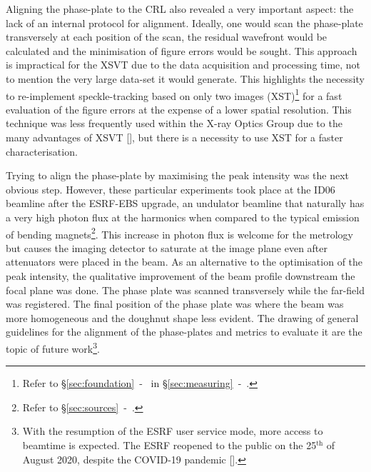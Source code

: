 \begin{refsection}
Aligning the phase-plate to the CRL also revealed a very important aspect: the lack of an internal protocol for alignment. Ideally, one would scan the phase-plate transversely at each position of the scan, the residual wavefront would be calculated and the minimisation of figure errors would be sought. This approach is impractical for the XSVT due to the data acquisition and processing time, not to mention the very large data-set it would generate. This highlights the necessity to re-implement speckle-tracking based on only two images (XST)\footnote{Refer to \S\ref{sec:foundation}~-~\textit{} in \S\ref{sec:measuring}~-~\textit{}.} for a fast evaluation of the figure errors at the expense of a lower spatial resolution. This technique was less frequently used within the X-ray Optics Group due to the many advantages of XSVT [\cite{Berujon2020}], but there is a necessity to use XST for a faster characterisation.

Trying to align the phase-plate by maximising the peak intensity was the next obvious step. However, these particular experiments took place at the ID06 beamline after the ESRF-EBS upgrade, an undulator beamline that naturally has a very high photon flux at the harmonics when compared to the typical emission of bending magnets\footnote{Refer to \S\ref{sec:sources}~-~\textit{}.}. This increase in photon flux is welcome for the metrology but causes the imaging detector to saturate at the image plane even after attenuators were placed in the beam. As an alternative to the optimisation of the peak intensity, the qualitative improvement of the beam profile downstream the focal plane was done. The phase plate was scanned transversely while the far-field was registered. The final position of the phase plate was where the beam was more homogeneous and the doughnut shape less evident. The drawing of general guidelines for the alignment of the phase-plates and metrics to evaluate it are the topic of future work\footnote{With the resumption of the ESRF user service mode, more access to beamtime is expected. The ESRF reopened to the public on the 25$^\text{th}$ of August 2020, despite the COVID-19 pandemic [\cite{Cho2020}].}.


\end{refsection}
